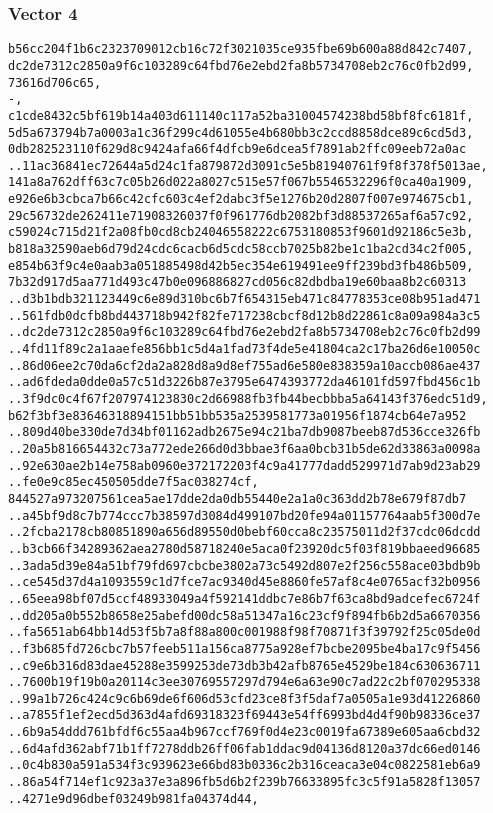 \documentclass[
]{article}
\begin{document}
\hypertarget{vector-4-2}{%
\subsubsection{Vector 4}\label{vector-4-2}}

\begin{verbatim}
b56cc204f1b6c2323709012cb16c72f3021035ce935fbe69b600a88d842c7407,
dc2de7312c2850a9f6c103289c64fbd76e2ebd2fa8b5734708eb2c76c0fb2d99,
73616d706c65,
-,
c1cde8432c5bf619b14a403d611140c117a52ba31004574238bd58bf8fc6181f,
5d5a673794b7a0003a1c36f299c4d61055e4b680bb3c2ccd8858dce89c6cd5d3,
0db282523110f629d8c9424afa66f4dfcb9e6dcea5f7891ab2ffc09eeb72a0ac
..11ac36841ec72644a5d24c1fa879872d3091c5e5b81940761f9f8f378f5013ae,
141a8a762dff63c7c05b26d022a8027c515e57f067b5546532296f0ca40a1909,
e926e6b3cbca7b66c42cfc603c4ef2dabc3f5e1276b20d2807f007e974675cb1,
29c56732de262411e71908326037f0f961776db2082bf3d88537265af6a57c92,
c59024c715d21f2a08fb0cd8cb24046558222c6753180853f9601d92186c5e3b,
b818a32590aeb6d79d24cdc6cacb6d5cdc58ccb7025b82be1c1ba2cd34c2f005,
e854b63f9c4e0aab3a051885498d42b5ec354e619491ee9ff239bd3fb486b509,
7b32d917d5aa771d493c47b0e096886827cd056c82dbdba19e60baa8b2c60313
..d3b1bdb321123449c6e89d310bc6b7f654315eb471c84778353ce08b951ad471
..561fdb0dcfb8bd443718b942f82fe717238cbcf8d12b8d22861c8a09a984a3c5
..dc2de7312c2850a9f6c103289c64fbd76e2ebd2fa8b5734708eb2c76c0fb2d99
..4fd11f89c2a1aaefe856bb1c5d4a1fad73f4de5e41804ca2c17ba26d6e10050c
..86d06ee2c70da6cf2da2a828d8a9d8ef755ad6e580e838359a10accb086ae437
..ad6fdeda0dde0a57c51d3226b87e3795e6474393772da46101fd597fbd456c1b
..3f9dc0c4f67f207974123830c2d66988fb3fb44becbbba5a64143f376edc51d9,
b62f3bf3e83646318894151bb51bb535a2539581773a01956f1874cb64e7a952
..809d40be330de7d34bf01162adb2675e94c21ba7db9087beeb87d536cce326fb
..20a5b816654432c73a772ede266d0d3bbae3f6aa0bcb31b5de62d33863a0098a
..92e630ae2b14e758ab0960e372172203f4c9a41777dadd529971d7ab9d23ab29
..fe0e9c85ec450505dde7f5ac038274cf,
844527a973207561cea5ae17dde2da0db55440e2a1a0c363dd2b78e679f87db7
..a45bf9d8c7b774ccc7b38597d3084d499107bd20fe94a01157764aab5f300d7e
..2fcba2178cb80851890a656d89550d0bebf60cca8c23575011d2f37cdc06dcdd
..b3cb66f34289362aea2780d58718240e5aca0f23920dc5f03f819bbaeed96685
..3ada5d39e84a51bf79fd697cbcbe3802a73c5492d807e2f256c558ace03bdb9b
..ce545d37d4a1093559c1d7fce7ac9340d45e8860fe57af8c4e0765acf32b0956
..65eea98bf07d5ccf48933049a4f592141ddbc7e86b7f63ca8bd9adcefec6724f
..dd205a0b552b8658e25abefd00dc58a51347a16c23cf9f894fb6b2d5a6670356
..fa5651ab64bb14d53f5b7a8f88a800c001988f98f70871f3f39792f25c05de0d
..f3b685fd726cbc7b57feeb511a156ca8775a928ef7bcbe2095be4ba17c9f5456
..c9e6b316d83dae45288e3599253de73db3b42afb8765e4529be184c630636711
..7600b19f19b0a20114c3ee30769557297d794e6a63e90c7ad22c2bf070295338
..99a1b726c424c9c6b69de6f606d53cfd23ce8f3f5daf7a0505a1e93d41226860
..a7855f1ef2ecd5d363d4afd69318323f69443e54ff6993bd4d4f90b98336ce37
..6b9a54ddd761bfdf6c55aa4b967ccf769f0d4e23c0019fa67389e605aa6cbd32
..6d4afd362abf71b1ff7278ddb26ff06fab1ddac9d04136d8120a37dc66ed0146
..0c4b830a591a534f3c939623e66bd83b0336c2b316ceaca3e04c0822581eb6a9
..86a54f714ef1c923a37e3a896fb5d6b2f239b76633895fc3c5f91a5828f13057
..4271e9d96dbef03249b981fa04374d44,
\end{verbatim}
\end{document}
